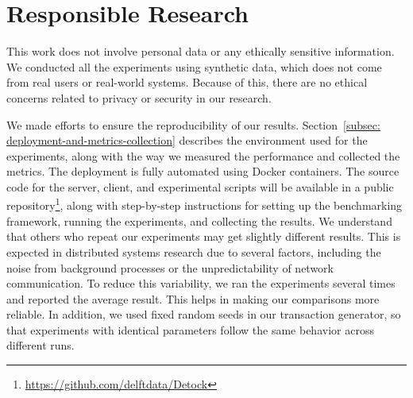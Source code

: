 \section{Responsible Research}
\label{sec: responsible-research}
This work does not involve personal data or any ethically sensitive information. We conducted all the experiments using synthetic data, which does not come from real users or real-world systems. Because of this, there are no ethical concerns related to privacy or security in our research.

We made efforts to ensure the reproducibility of our results. Section~\ref{subsec: deployment-and-metrics-collection} describes the environment used for the experiments, along with the way we measured the performance and collected the metrics. The deployment is fully automated using Docker containers. The source code for the server, client, and experimental scripts will be available in a public repository\footnote{\url{https://github.com/delftdata/Detock}}, along with step-by-step instructions for setting up the benchmarking framework, running the experiments, and collecting the results. We understand that others who repeat our experiments may get slightly different results. This is expected in distributed systems research due to several factors, including the noise from background processes or the unpredictability of network communication. To reduce this variability, we ran the experiments several times and reported the average result. This helps in making our comparisons more reliable. In addition, we used fixed random seeds in our transaction generator, so that experiments with identical parameters follow the same behavior across different runs.